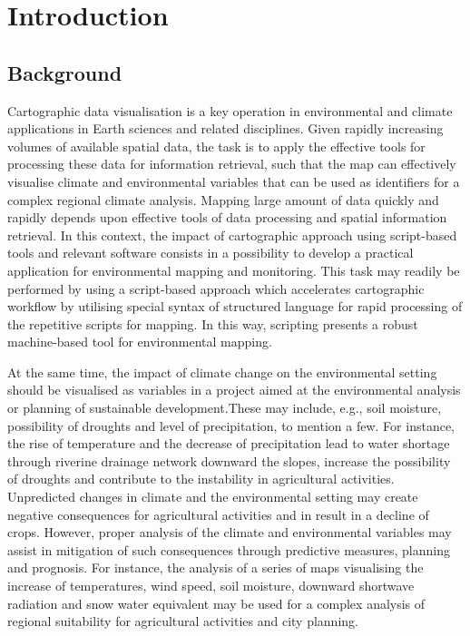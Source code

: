\documentclass[geosciences,article,accept,pdftex,oneauthor]{Definitions/mdpi}
\begin{document}
\section{Introduction}

\subsection{Background}

{Cartographic data visualisation is a key operation in environmental and climate applications in Earth sciences and related disciplines. Given rapidly increasing volumes of available spatial data, the task is to apply the effective tools for processing these data for information retrieval, such that the map can effectively visualise climate and environmental variables that can be used as identifiers for a complex regional climate analysis. 
Mapping large amount of data quickly and rapidly depends upon effective tools of data processing and spatial information retrieval. In this context, the impact of cartographic approach using script-based tools and relevant software  consists in a possibility to develop a practical application for environmental mapping and monitoring. This task may readily be performed by using a script-based approach which accelerates cartographic workflow by utilising special syntax of structured language for rapid processing of the repetitive scripts for mapping. In this way, scripting presents a robust machine-based tool for environmental mapping.} 

{At the same time, the impact of climate change on the environmental setting should be visualised as variables in a project aimed at the environmental analysis or planning of sustainable development.These may include, e.g., soil moisture, possibility of droughts and level of precipitation, to mention a few. For instance, the rise of temperature and the decrease of precipitation lead to water shortage through riverine drainage network downward the slopes, increase the possibility of droughts and contribute to the instability in agricultural activities. Unpredicted changes in climate and the environmental setting may create negative consequences for agricultural activities and in result in a decline of crops. However, proper analysis of the climate and environmental variables may assist in mitigation of such consequences through predictive measures, planning and prognosis. For instance, the analysis of a series of maps visualising the increase of temperatures, wind speed, soil moisture, downward shortwave radiation and snow water equivalent may be used for a complex analysis of regional suitability for agricultural activities and city planning.}
\end{document}
